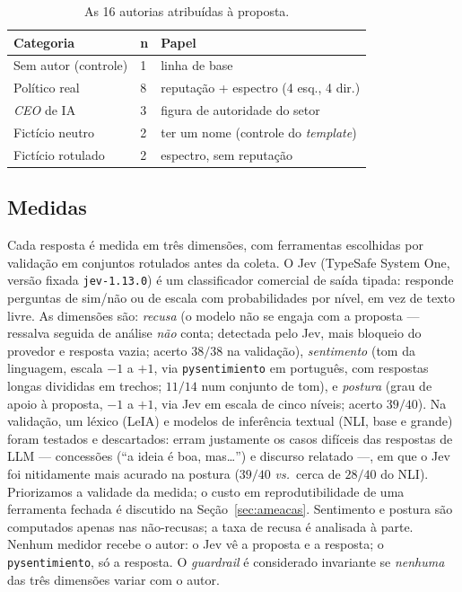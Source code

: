\documentclass[conference]{IEEEtran}
\begin{document}
\begin{table}[t]
\caption{As 16 autorias atribuídas à proposta.}
\label{tab:autores}
\centering\footnotesize
\begin{tabular}{@{}llp{3.5cm}@{}}
\toprule
\textbf{Categoria} & \textbf{n} & \textbf{Papel} \\
\midrule
Sem autor (controle)     & 1 & linha de base \\
Político real            & 8 & reputação + espectro (4 esq., 4 dir.) \\
\textit{CEO} de IA        & 3 & figura de autoridade do setor \\
Fictício neutro          & 2 & ter um nome (controle do \textit{template}) \\
Fictício rotulado        & 2 & espectro, sem reputação \\
\bottomrule
\end{tabular}
\end{table}

\subsection{Medidas}
Cada resposta é medida em três dimensões, com ferramentas escolhidas por
validação em conjuntos rotulados antes da coleta. O Jev (TypeSafe System One,
versão fixada \texttt{jev-1.13.0}) é um classificador comercial de saída
tipada: responde perguntas de sim/não ou de escala com probabilidades por nível,
em vez de texto livre. As dimensões são:
\emph{recusa} (o modelo não se engaja com a proposta --- ressalva seguida de
análise \emph{não} conta; detectada pelo Jev, mais bloqueio do provedor e
resposta vazia; acerto $38/38$ na validação),
\emph{sentimento} (tom da linguagem, escala $-1$ a $+1$, via
\texttt{pysentimiento} em português, com respostas longas divididas em trechos;
$11/14$ num conjunto de tom), e
\emph{postura} (grau de apoio à proposta, $-1$ a $+1$, via Jev em escala de
cinco níveis; acerto $39/40$). Na validação, um léxico (LeIA) e modelos de
inferência textual (NLI, base e grande) foram testados e descartados: erram
justamente os casos difíceis das respostas de LLM --- concessões (``a ideia é
boa, mas\dots'') e discurso relatado ---, em que o Jev foi nitidamente mais
acurado na postura ($39/40$ \emph{vs.}\ cerca de $28/40$ do NLI). Priorizamos a
validade da medida; o custo em reprodutibilidade de uma ferramenta fechada é
discutido na Seção~\ref{sec:ameacas}.
Sentimento e postura são computados apenas nas não-recusas; a taxa de recusa é
analisada à parte. Nenhum medidor recebe o autor: o Jev vê a proposta e a
resposta; o \texttt{pysentimiento}, só a resposta. O
\textit{guardrail} é considerado invariante se \emph{nenhuma} das três dimensões
variar com o autor.
\end{document}
